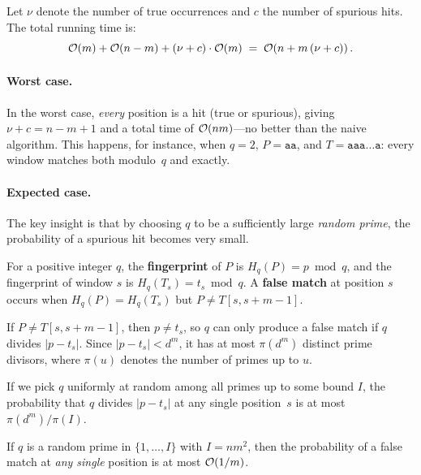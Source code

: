 Let $\nu$ denote the number of true occurrences and $c$ the number of
spurious hits.
The total running time is:
\[
  \mathcal{O}\!\left(m\right) + \mathcal{O}\!\left(n - m\right) + (\nu + c) \cdot \mathcal{O}\!\left(m\right)
  \;=\;
  \mathcal{O}\!\left(n + m\,(\nu + c)\right).
\]

\paragraph{Worst case.}
In the worst case, \emph{every} position is a hit (true or spurious),
giving $\nu + c = n - m + 1$ and a total time of $\mathcal{O}\!\left(nm\right)$---no
better than the naive algorithm.
This happens, for instance, when $q = 2$, $P = \texttt{aa}$, and
$T = \texttt{aaa\ldots a}$: every window matches both modulo~$q$ and
exactly.

\paragraph{Expected case.}
The key insight is that by choosing $q$ to be a sufficiently large
\emph{random prime}, the probability of a spurious hit becomes very
small.

\begin{definition}[Fingerprint]
  For a positive integer $q$, the \textbf{fingerprint} of $P$ is
  $H_q(P) = p \bmod q$, and the fingerprint of window $s$ is
  $H_q(T_s) = t_s \bmod q$.
  A \textbf{false match} at position $s$ occurs when
  $H_q(P) = H_q(T_s)$ but $P \neq T[s, s+m-1]$.
\end{definition}

If $P \neq T[s, s+m-1]$, then $p \neq t_s$, so $q$ can only produce a
false match if $q$ divides $|p - t_s|$.
Since $|p - t_s| < d^m$, it has at most $\pi(d^m)$ distinct prime
divisors, where $\pi(u)$ denotes the number of primes up to $u$.

If we pick $q$ uniformly at random among all primes up to some bound
$I$, the probability that $q$ divides $|p - t_s|$ at any single
position~$s$ is at most $\pi(d^m) / \pi(I)$.

\begin{theorem}
  \label{thm:rabin-karp-error}
  If $q$ is a random prime in $\{1, \ldots, I\}$ with $I = nm^2$,
  then the probability of a false match at \emph{any single} position
  is at most $\mathcal{O}\!\left(1/m\right)$.
\end{theorem}


